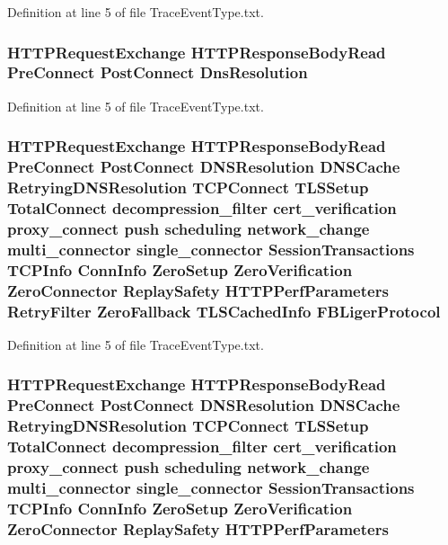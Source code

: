 Definition at line 5 of file Trace\+Event\+Type.\+txt.

\subsubsection[{Dns\+Resolution}]{ H\+T\+T\+P\+Request\+Exchange H\+T\+T\+P\+Response\+Body\+Read {\bf Pre\+Connect} {\bf Post\+Connect} Dns\+Resolution}\label{TraceEventType_8txt_aa18ca5c8ce9e98b92694ab86b7f823bc}


Definition at line 5 of file Trace\+Event\+Type.\+txt.

\subsubsection[{F\+B\+Liger\+Protocol}]{ H\+T\+T\+P\+Request\+Exchange H\+T\+T\+P\+Response\+Body\+Read {\bf Pre\+Connect} {\bf Post\+Connect} D\+N\+S\+Resolution D\+N\+S\+Cache Retrying\+D\+N\+S\+Resolution T\+C\+P\+Connect T\+L\+S\+Setup {\bf Total\+Connect} decompression\+\_\+filter cert\+\_\+verification proxy\+\_\+connect push scheduling network\+\_\+change multi\+\_\+connector single\+\_\+connector {\bf Session\+Transactions} {\bf T\+C\+P\+Info} {\bf Conn\+Info} {\bf Zero\+Setup} {\bf Zero\+Verification} {\bf Zero\+Connector} {\bf Replay\+Safety} {\bf H\+T\+T\+P\+Perf\+Parameters} {\bf Retry\+Filter} {\bf Zero\+Fallback} {\bf T\+L\+S\+Cached\+Info} F\+B\+Liger\+Protocol}\label{TraceEventType_8txt_a999a7d27838e93c828d723c040d687c8}


Definition at line 5 of file Trace\+Event\+Type.\+txt.

\subsubsection[{H\+T\+T\+P\+Perf\+Parameters}]{ H\+T\+T\+P\+Request\+Exchange H\+T\+T\+P\+Response\+Body\+Read {\bf Pre\+Connect} {\bf Post\+Connect} D\+N\+S\+Resolution D\+N\+S\+Cache Retrying\+D\+N\+S\+Resolution T\+C\+P\+Connect T\+L\+S\+Setup {\bf Total\+Connect} decompression\+\_\+filter cert\+\_\+verification proxy\+\_\+connect push scheduling network\+\_\+change multi\+\_\+connector single\+\_\+connector {\bf Session\+Transactions} {\bf T\+C\+P\+Info} {\bf Conn\+Info} {\bf Zero\+Setup} {\bf Zero\+Verification} {\bf Zero\+Connector} {\bf Replay\+Safety} H\+T\+T\+P\+Perf\+Parameters}\label{TraceEventType_8txt_a947bfa0b9c7948f454a8edbb902211a2}


